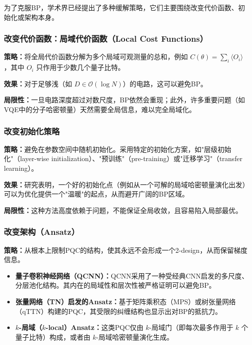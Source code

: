 \documentclass[12pt,a4paper]{article}
\begin{document}
为了克服BP，学术界已经提出了多种缓解策略，它们主要围绕改变代价函数、初始化或架构本身。

\subsubsection{改变代价函数：局域代价函数（Local Cost Functions）}

\textbf{策略：}将全局代价函数分解为多个局域可观测量的总和，例如 $C(\theta) = \sum_i \langle O_i \rangle$，其中 $O_i$ 只作用于少数几个量子比特。

\textbf{效果：}对于足够浅（如 $D \in \mathcal{O}(\log N)$）的电路，这可以避免BP。

\textbf{局限性：}一旦电路深度超过对数尺度，BP依然会重现；此外，许多重要问题（如VQE中的分子哈密顿量）天然需要全局信息，难以完全局域化。

\subsubsection{改变初始化策略}

\textbf{策略：}避免在参数空间中随机初始化。采用特定的初始化方案，如"层级初始化"（layer-wise initialization）、"预训练"（pre-training）或"迁移学习"（transfer learning）。

\textbf{效果：}研究表明，一个好的初始化点（例如从一个可解的局域哈密顿量演化出发）可以为优化提供一个"温暖"的起点，从而避开广阔的BP区域。

\textbf{局限性：}这种方法高度依赖于问题，不能保证全局收敛，且容易陷入局部最优。

\subsubsection{改变架构（Ansatz）}

\textbf{策略：}从根本上限制PQC的结构，使其永远不会形成一个2-design，从而保留梯度信息。

\begin{itemize}
\item \textbf{量子卷积神经网络（QCNN）：}QCNN采用了一种受经典CNN启发的多尺度、分层池化结构。其内在的局域性和层次性被严格证明可以避免BP。

\item \textbf{张量网络（TN）启发的Ansatz：}基于矩阵乘积态（MPS）或树张量网络（qTTN）构建的PQC，其受限的纠缠结构也显示出对BP的抵抗力。

\item \textbf{$k$-局域（$k$-local）Ansatz：}这类PQC仅由 $k$-局域门（即每次最多作用于 $k$ 个量子比特）构成，或者由 $k$-局域哈密顿量演化生成。
\end{itemize}
\end{document}
